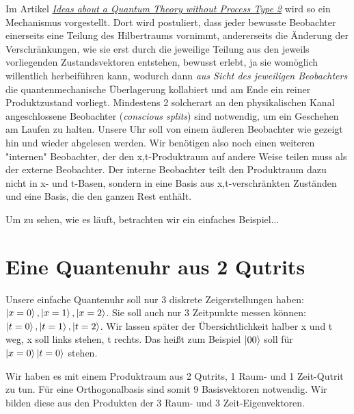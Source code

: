 \documentclass[12pt]{article}
\begin{document}
Im Artikel \emph{\href{https://docs.google.com/document/d/1OrmVETmnBSe5c0CpTbKH8Vq5pWFuB8QUez-KqHTaarQ/edit?usp=sharing}{Ideas about a Quantum Theory without Process Type 2}} wird so ein Mechanismus vorgestellt. Dort wird postuliert, dass jeder bewusste Beobachter einerseits eine Teilung des Hilbertraums vornimmt, andererseits die Änderung der Verschränkungen, wie sie erst durch die jeweilige Teilung aus den jeweils vorliegenden Zustandsvektoren entstehen, bewusst erlebt, ja sie womöglich willentlich herbeiführen kann, wodurch dann \emph{aus Sicht des jeweiligen Beobachters} die quantenmechanische Überlagerung kollabiert und am Ende ein reiner Produktzustand vorliegt. Mindestens 2 solcherart an den physikalischen Kanal angeschlossene Beobachter (\emph{conscious splits}) sind notwendig, um ein Geschehen am Laufen zu halten. Unsere Uhr soll von einem äußeren Beobachter wie gezeigt hin und wieder abgelesen werden. Wir benötigen also noch einen weiteren "internen" Beobachter, der den x,t-Produktraum auf andere Weise teilen muss als der externe Beobachter. Der interne Beobachter teilt den Produktraum dazu nicht in x- und t-Basen, sondern in eine Basis aus x,t-verschränkten Zuständen und eine Basis, die den ganzen Rest enthält.

Um zu sehen, wie es läuft, betrachten wir ein einfaches Beispiel...

\section{Eine Quantenuhr aus 2 Qutrits}

Unsere einfache Quantenuhr soll nur 3 diskrete Zeigerstellungen haben: $\ket{x=0}, \ket{x=1}, \ket{x=2}$. Sie soll auch nur 3 Zeitpunkte messen können: $\ket{t=0}, \ket{t=1}, \ket{t=2}$. Wir lassen später der Übersichtlichkeit halber x und t weg, x soll links stehen, t rechts. Das heißt zum Beispiel $\ket{00}$ soll für $\ket{x=0}\ket{t=0}$ stehen. 

Wir haben es mit einem Produktraum aus 2 Qutrits, 1 Raum- und 1 Zeit-Qutrit zu tun. Für eine Orthogonalbasis sind somit 9 Basisvektoren notwendig. Wir bilden diese aus den Produkten der 3 Raum- und 3 Zeit-Eigenvektoren.
\end{document}
